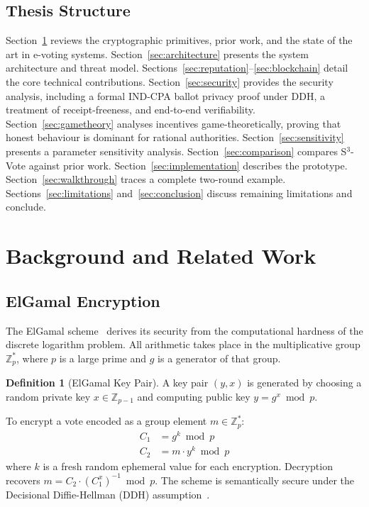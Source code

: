 \documentclass[12pt,a4paper]{article}
\theoremstyle{definition}
\newtheorem{definition}{Definition}[section]
\theoremstyle{remark}
\begin{document}
\subsection{Thesis Structure}

Section~\ref{sec:background} reviews the cryptographic primitives,
prior work, and the state of the art in e-voting systems.
Section~\ref{sec:architecture} presents the system architecture and
threat model. Sections~\ref{sec:reputation}--\ref{sec:blockchain}
detail the core technical contributions.
Section~\ref{sec:security} provides the security analysis, including a
formal IND-CPA ballot privacy proof under DDH, a treatment of
receipt-freeness, and end-to-end verifiability.
Section~\ref{sec:gametheory} analyses incentives game-theoretically,
proving that honest behaviour is dominant for rational authorities.
Section~\ref{sec:sensitivity} presents a parameter sensitivity analysis.
Section~\ref{sec:comparison} compares S$^3$-Vote against prior work.
Section~\ref{sec:implementation} describes the prototype.
Section~\ref{sec:walkthrough} traces a complete two-round example.
Sections~\ref{sec:limitations} and~\ref{sec:conclusion} discuss remaining
limitations and conclude.

\section{Background and Related Work}
\label{sec:background}

\subsection{ElGamal Encryption}

The ElGamal scheme~\cite{elgamal1985} derives its security from the
computational hardness of the discrete logarithm problem.
All arithmetic takes place in the multiplicative group $\mathbb{Z}_p^*$,
where $p$ is a large prime and $g$ is a generator of that group.

\begin{definition}[ElGamal Key Pair]
  A key pair $(y, x)$ is generated by choosing a random private key
  $x \in \mathbb{Z}_{p-1}$ and computing public key $y = g^x \bmod p$.
\end{definition}

To encrypt a vote encoded as a group element $m \in \mathbb{Z}_p^*$:
\begin{align}
  C_1 &= g^k \bmod p \label{eq:eg1}\\
  C_2 &= m \cdot y^k \bmod p \label{eq:eg2}
\end{align}
where $k$ is a fresh random ephemeral value for each encryption.
Decryption recovers $m = C_2 \cdot (C_1^x)^{-1} \bmod p$.
The scheme is semantically secure under the Decisional Diffie-Hellman (DDH)
assumption~\cite{elgamal1985,boneh1998}.
\end{document}
